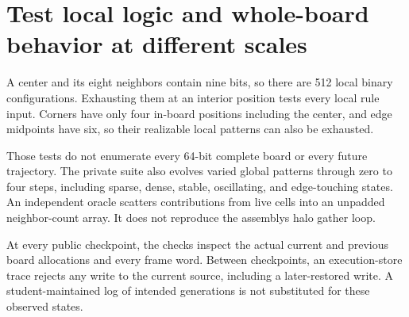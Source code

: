 \section{Test local logic and whole-board behavior at different
  scales}\label{008-life-generations-p11-test-local-logic-and-whole-board-behavior-at-different-scales}

A center and its eight neighbors contain nine bits, so there are 512
local binary configurations. Exhausting them at an interior position
tests every local rule input. Corners have only four in-board positions
including the center, and edge midpoints have six, so their realizable
local patterns can also be exhausted.

Those tests do not enumerate every 64-bit complete board or every future
trajectory. The private suite also evolves varied global patterns
through zero to four steps, including sparse, dense, stable,
oscillating, and edge-touching states. An independent oracle scatters
contributions from live cells into an unpadded neighbor-count array. It
does not reproduce the assembly\textquotesingle s halo gather loop.

At every public checkpoint, the checks inspect the actual current and
previous board allocations and every frame word. Between checkpoints, an
execution-store trace rejects any write to the current source, including
a later-restored write. A student-maintained log of intended generations
is not substituted for these observed states.
